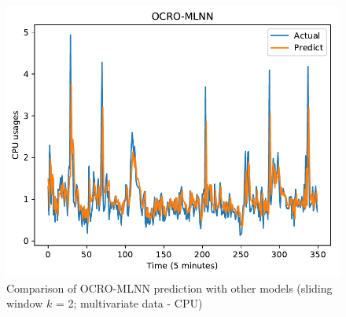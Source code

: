 \documentclass[11pt,twoside]{article}
\begin{document}
\begin{multicols}{2}
\begin{figure}[!ht]
\begin{minipage}[b]{0.33\linewidth}
    \includegraphics[width=0.9\linewidth]{images/pdf/predict/k2/cpu_k2_ocro_mlnn.pdf} 
  \end{minipage} 
  
  \caption{Comparison of OCRO-MLNN prediction with other models (sliding window $k$ = 2; multivariate data - CPU)} 
  \label{predict_cpu_sliding2} 
\end{figure}


\end{multicols}
\end{document}
